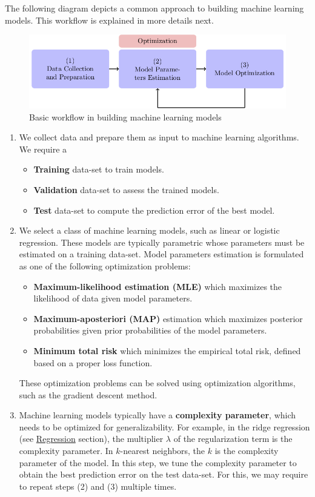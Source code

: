 \documentclass[11pt]{article}
\begin{document}
The following diagram depicts a common approach to building machine learning models. This workflow is explained in more details next.

\begin{figure}[htb]
\centering
\includegraphics[width=.9\linewidth]{./images/machine-learning-workflow.png}
\caption{\label{fig:orgparagraph2}
Basic workflow in building machine learning models}
\end{figure}

\begin{enumerate}
\item We collect data and prepare them as input to machine learning algorithms. We require a
\begin{itemize}
\item \textbf{Training} data-set to train models.
\item \textbf{Validation} data-set to assess the trained models.
\item \textbf{Test} data-set to compute the prediction error of the best model.
\end{itemize}
\item We select a class of machine learning models, such as linear or logistic regression. These models are typically parametric whose parameters must be estimated on a training data-set. Model parameters estimation is formulated as one of the following optimization problems:
\begin{itemize}
\item \textbf{Maximum-likelihood estimation (MLE)} which maximizes the likelihood of data given model parameters.
\item \textbf{Maximum-aposteriori (MAP)} estimation which maximizes posterior probabilities given prior probabilities of the model parameters.
\item \textbf{Minimum total risk} which minimizes the empirical total risk, defined based on a proper loss function.
\end{itemize}
These optimization problems can be solved using optimization algorithms, such as the gradient descent method.
\item Machine learning models typically have a \textbf{complexity parameter}, which needs to be optimized for generalizability. For example, in the ridge regression (see \hyperref[orgtarget1]{Regression} section), the multiplier \(\lambda\) of the regularization term is the complexity parameter. In \(k\)-nearest neighbors, the \(k\) is the complexity parameter of the model. In this step, we tune the complexity parameter to obtain the best prediction error on the test data-set. For this, we may require to repeat steps (2) and (3) multiple times.
\end{enumerate}
\end{document}

